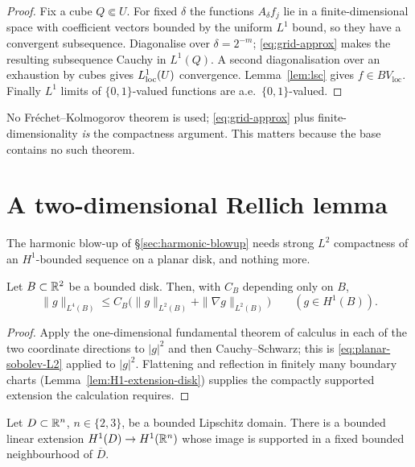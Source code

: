 \begin{proof}
Fix a cube $Q\Subset U$.  For fixed $\delta$ the functions $A_\delta f_j$ lie
in a finite-dimensional space with coefficient vectors bounded by the uniform
$L^1$ bound, so they have a convergent subsequence.  Diagonalise over
$\delta=2^{-m}$; \eqref{eq:grid-approx} makes the resulting subsequence
Cauchy in $L^1(Q)$.  A second diagonalisation over an exhaustion by cubes
gives $L^1_{\mathrm{loc}}(U)$ convergence.  Lemma~\ref{lem:lsc} gives
$f\in BV_{\mathrm{loc}}$.  Finally $L^1$ limits of $\{0,1\}$-valued functions
are a.e.\ $\{0,1\}$-valued.
\end{proof}

\begin{fnote}\label{fnote:no-frechet-kolmogorov}
No Fr\'echet--Kolmogorov theorem is used; \eqref{eq:grid-approx} plus
finite-dimensionality \emph{is} the compactness argument.  This matters
because the base contains no such theorem.
\end{fnote}

\section{A two-dimensional Rellich lemma}\label{sec:rellich}

The harmonic blow-up of \S\ref{sec:harmonic-blowup} needs strong $L^2$
compactness of an $H^1$-bounded sequence on a planar disk, and nothing more.

\begin{lemma}\label{lem:planar-GN}
Let $B\subset\mathbb R^2$ be a bounded disk.  Then, with $C_B$ depending only on
$B$,
\begin{equation}\label{eq:planar-GN}
  \|g\|_{L^4(B)}\le C_B\bigl(\|g\|_{L^2(B)}+\|\nabla g\|_{L^2(B)}\bigr)
  \qquad(g\in H^1(B)).
\end{equation}
\end{lemma}

\begin{proof}
Apply the one-dimensional fundamental theorem of calculus in each of the two
coordinate directions to $|g|^2$ and then Cauchy--Schwarz; this is
\eqref{eq:planar-sobolev-L2} applied to $|g|^2$.  Flattening and reflection in
finitely many boundary charts (Lemma~\ref{lem:H1-extension-disk}) supplies the
compactly supported extension the calculation requires.
\end{proof}

\begin{lemma}
\label{lem:H1-extension-disk}
Let $D\subset\mathbb R^n$, $n\in\{2,3\}$, be a bounded Lipschitz domain.  There is
a bounded linear extension $H^1(D)\to H^1(\mathbb R^n)$ whose image is supported in
a fixed bounded neighbourhood of $\overline D$.
\end{lemma}

